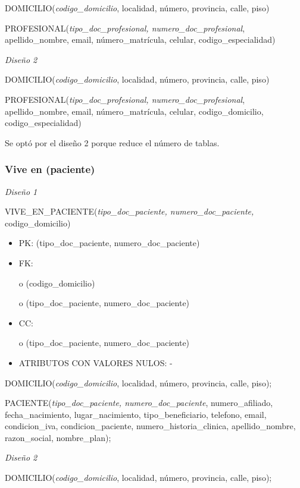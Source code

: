 \documentclass[a4paper,11pt]{article}
\begin{document}
DOMICILIO(\emph{codigo\_domicilio}, localidad, número, provincia, calle, piso)

PROFESIONAL(\emph{tipo\_doc\_profesional, numero\_doc\_profesional}, apellido\_nombre, 
email, número\_matrícula, celular, codigo\_especialidad)

\textit{Diseño 2}

DOMICILIO(\emph{codigo\_domicilio}, localidad, número, provincia, calle, piso)

PROFESIONAL(\emph{tipo\_doc\_profesional, numero\_doc\_profesional}, apellido\_nombre, 
email, número\_matrícula, celular,\textit{\textbf{ }}codigo\_domicilio, codigo\_especialidad)

Se optó por el diseño 2 porque reduce el número de tablas.\label{HToc293405843}

\subsubsection{\textbf{Vive en (paciente)}}

\textit{Diseño 1}

VIVE\_EN\_PACIENTE(\emph{tipo\_doc\_paciente, numero\_doc\_paciente,} codigo\_domicilio)

\begin{itemize}
\item PK: (tipo\_doc\_paciente, numero\_doc\_paciente)

\item FK: 

o (codigo\_domicilio)

o (tipo\_doc\_paciente, numero\_doc\_paciente)

\item CC:

o (tipo\_doc\_paciente, numero\_doc\_paciente)

\item ATRIBUTOS CON VALORES NULOS: -
\end{itemize}

DOMICILIO(\emph{codigo\_domicilio}, localidad, número, provincia, calle, piso);

PACIENTE(\emph{tipo\_doc\_paciente, numero\_doc\_paciente}, numero\_afiliado, fecha\_nacimiento, 
lugar\_nacimiento, tipo\_beneficiario, telefono, email, condicion\_iva, condicion\_paciente, 
numero\_historia\_clinica, apellido\_nombre, razon\_social,  nombre\_plan);

\textit{Diseño 2}

DOMICILIO(\emph{codigo\_domicilio}, localidad, número, provincia, calle, piso);
\end{document}
